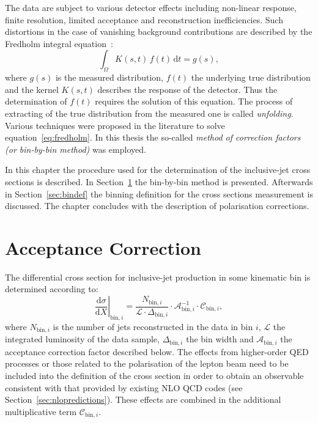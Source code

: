 The data are subject to various detector effects including non-linear response, finite resolution, limited acceptance and reconstruction inefficiencies. Such distortions in the case of vanishing background contributions are described by the Fredholm integral equation~\cite{Behnke:2013pga}:
\begin{equation}
 \int_\Omega K\left(s,t\right)\,f\left(t\right)\,\mathrm{d}t = g\left(s\right),
 \label{eq:fredholm}
\end{equation}
where $g\left(s\right)$ is the measured distribution, $f\left(t\right)$ the underlying true distribution and the kernel $K\left(s,t\right)$ describes the response of the detector. Thus the determination of $f\left(t\right)$ requires the solution of this equation.
The process of extracting of the true distribution from the measured one is called \emph{unfolding}. Various techniques were proposed in the literature to solve equation~\ref{eq:fredholm}. In this thesis the so-called \emph{method of correction factors (or bin-by-bin method)} was employed.

In this chapter the procedure used for the determination of the inclusive-jet cross sections is described. In Section~\ref{sec:acccor} the bin-by-bin method is presented. Afterwards in Section~\ref{sec:bindef} the binning definition for the cross sections measurement is discussed. The chapter concludes with the description of polarisation corrections.

\section{Acceptance Correction}
\label{sec:acccor}
The differential cross section for inclusive-jet production in some kinematic bin is determined according to:
\begin{equation}
 \left.\frac{\mathrm{d}\sigma}{\mathrm{d}X}\right|_{\mathrm{bin},i} = \frac{N_{\mathrm{bin},i}}{\mathcal{L} \cdot \Delta_{\mathrm{bin},i}} \cdot \mathcal{A}^{-1}_{\mathrm{bin},i} \cdot \mathcal{C}_{\mathrm{bin},i},
 \label{eq:csdef}
\end{equation}
where $N_{\mathrm{bin},i}$ is the number of jets reconstructed in the data in bin $i$, $\mathcal{L}$ the integrated luminosity of the data sample, $\Delta_{\mathrm{bin},i}$ the bin width and $\mathcal{A}_{\mathrm{bin},i}$ the acceptance correction factor described below. The effects from higher-order QED processes or those related to the polarisation of the lepton beam need to be included into the definition of the cross section in order to obtain an observable consistent with that provided by existing NLO QCD codes (see Section~\ref{sec:nlopredictions}). These effects are combined in the additional multiplicative term $\mathcal{C}_{\mathrm{bin},i}$.

